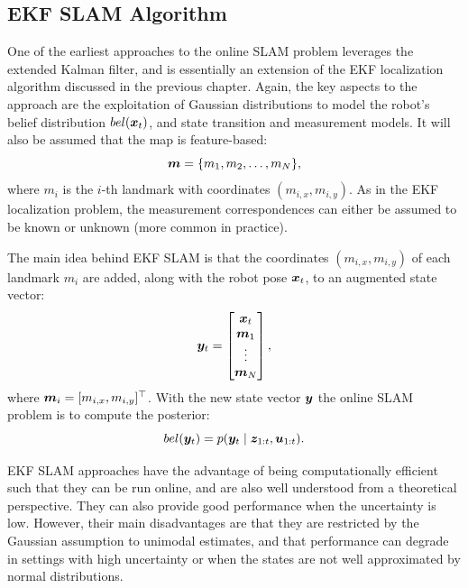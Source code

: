 \subsection{EKF SLAM Algorithm}
One of the earliest approaches to the online SLAM problem leverages the extended Kalman filter, and is essentially an extension of the EKF localization algorithm discussed in the previous chapter. Again, the key aspects to the approach are the exploitation of Gaussian distributions to model the robot's belief distribution $bel(\bm{x}_t)$, and state transition and measurement models.
It will also be assumed that the map is feature-based:
\begin{equation*}
\bm{m} = \{m_1,m_2,\dots ,m_N\},
\end{equation*}
where $m_i$ is the $i$-th landmark with coordinates $(m_{i,x}, m_{i,y})$. As in the EKF localization problem, the measurement correspondences can either be assumed to be known or unknown (more common in practice).

The main idea behind EKF SLAM is that the coordinates $(m_{i,x}, m_{i,y})$ of each landmark $m_i$ are added, along with the robot pose $\bm{x}_t$, to an augmented state vector:
\begin{equation} \label{eq:augmentedstate}
\bm{y}_t = \begin{bmatrix}
\bm{x}_t \\ \bm{m}_1 \\ \vdots \\ \bm{m}_N
\end{bmatrix},
\end{equation}
where $\bm{m}_i = [m_{i,x}, m_{i,y}]^\top $. With the new state vector $\bm{y}$ the online SLAM problem is to compute the posterior:
\begin{equation*}
bel(\bm{y}_t) = p(\bm{y}_t \mid \bm{z}_{1:t}, \bm{u}_{1:t}).
\end{equation*}

EKF SLAM approaches have the advantage of being computationally efficient such that they can be run online, and are also well understood from a theoretical perspective. They can also provide good performance when the uncertainty is low. However, their main disadvantages are that they are restricted by the Gaussian assumption to unimodal estimates, and that performance can degrade in settings with high uncertainty or when the states are not well approximated by normal distributions.

